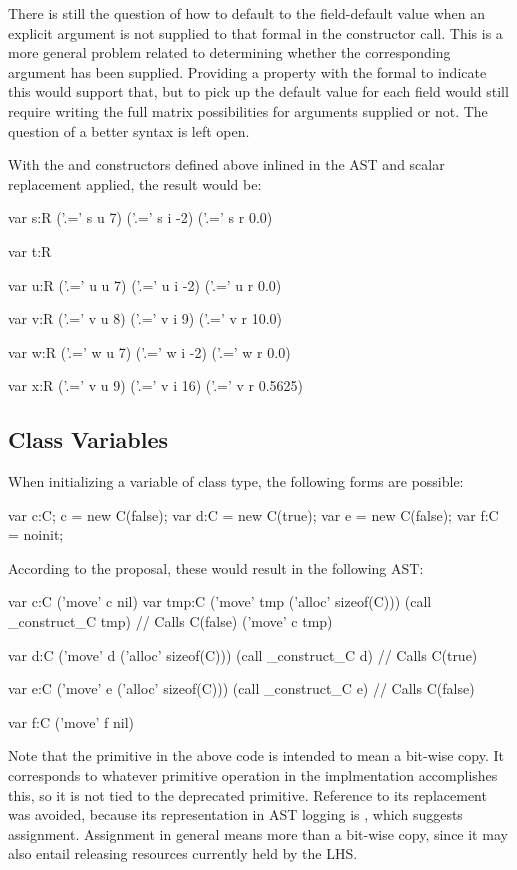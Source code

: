 There is still the question of how to default to the field-default value when an explicit
argument is not supplied to that formal in the constructor call.  This is a more general
problem related to determining whether the corresponding argument has been supplied.
Providing a property with the formal to indicate this would support that, but to pick up
the default value for each field would still require writing the full matrix
possibilities for arguments supplied or not.  The question of a better syntax is left open.

With the  and constructors defined above inlined in the AST and scalar
replacement applied, the result would be:
\begin{numberedchapel}
  var s:R
  ('.=' s u 7)
  ('.=' s i -2)
  ('.=' s r 0.0)

  var t:R

  var u:R
  ('.=' u u 7)
  ('.=' u i -2)
  ('.=' u r 0.0)

  var v:R
  ('.=' v u 8)
  ('.=' v i 9)
  ('.=' v r 10.0)

  var w:R
  ('.=' w u 7)
  ('.=' w i -2)
  ('.=' w r 0.0)

  var x:R
  ('.=' v u 9)
  ('.=' v i 16)
  ('.=' v r 0.5625)
\end{numberedchapel}


\subsection{Class Variables}
When initializing a variable of class type, the following forms are possible:
\begin{chapel}
  var c:C; c = new C(false);
  var d:C = new C(true);
  var e = new C(false);
  var f:C = noinit;
\end{chapel}
\noindent
According to the proposal, these would result in the following AST:
\begin{numberedchapel}
  var c:C
  ('move' c nil)
  var tmp:C
  ('move' tmp ('alloc' sizeof(C)))
  (call _construct_C tmp) // Calls C(false)
  ('move' c tmp)

  var d:C
  ('move' d ('alloc' sizeof(C)))
  (call _construct_C d) // Calls C(true)

  var e:C
  ('move' e ('alloc' sizeof(C)))
  (call _construct_C e) // Calls C(false)

  var f:C
  ('move' f nil)
\end{numberedchapel}
\noindent
Note that the primitive  in the above code is intended to mean a bit-wise
copy.  It corresponds to whatever primitive operation in the implmentation accomplishes
this, so it is not tied to the deprecated  primitive.  Reference to its
replacement  was avoided, because its representation in AST logging is
, which suggests assignment.  Assignment in general means more than a
bit-wise copy, since it may also entail releasing resources currently held by the LHS.

